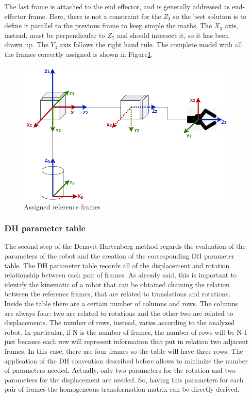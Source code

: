 The last frame is attached to the end effector, and is generally addressed as end-effector frame. Here, there is not a constraint for the $Z_3$ so the best solution is to define it parallel to the previous frame to keep simple the maths. The $X_3$ axis, instead, must be perpendicular to $Z_2$ and should intersect it, so it has been drawn up. The $Y_3$ axis follows the right hand rule. The complete model with all the frames correctly assigned is shown in Figure\ref{fig:complete_frames}.

\begin{figure}[!h]
\begin{center}
\includegraphics[width=0.6\linewidth]{capitolo3/figure/complete_frames.png}
\caption{Assigned reference frames}
\label{fig:complete_frames}
\end{center}
\end{figure}

\newpage
\subsubsection{DH parameter table}
The second step of the Denavit-Hartenberg method regards the evaluation of the parameters of the robot and the creation of the corresponding DH parameter table. The DH parameter table records all of the displacement and rotation relationship between each pair of frames. As already said, this is important to identify the kinematic of a robot that can be obtained chaining the relation between the reference frames, that are related to translations and rotations. 
Inside the table there are a certain number of columns and rows. 
The columns are always four: two are related to rotations and the other two are related to displacements. 
The number of rows, instead, varies according to the analyzed robot. In particular, if N is the number of frames, the number of rows will be N-1 just because each row will represent information that put in relation two adjacent frames. In this case, there are four frames so the table will have three rows. The application of the DH convention described before allows to minimize the number of parameters needed. Actually, only two parameters for the rotation and two parameters for the displacement are needed. So, having this parameters for each pair of frames the homogeneous transformation matrix can be directly derived.

